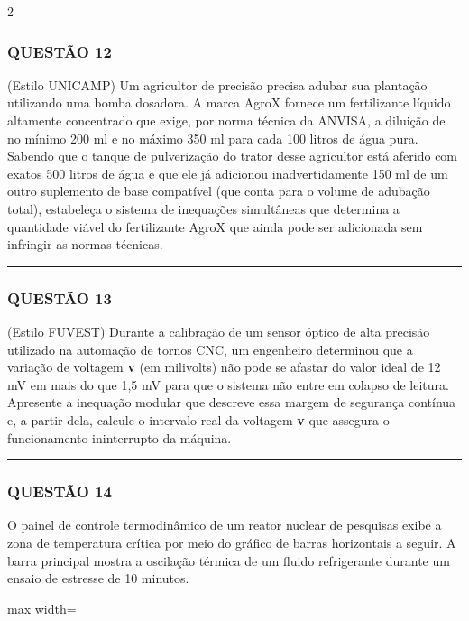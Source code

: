 \documentclass[twoside, 10pt, a4paper]{article}
\begin{document}
\begin{multicols*}{2}
\subsubsection*{QUESTÃO 12}
(Estilo UNICAMP) Um agricultor de precisão precisa adubar sua plantação utilizando uma bomba dosadora. A marca AgroX fornece um fertilizante líquido altamente concentrado que exige, por norma técnica da ANVISA, a diluição de no mínimo 200 ml e no máximo 350 ml para cada 100 litros de água pura. Sabendo que o tanque de pulverização do trator desse agricultor está aferido com exatos 500 litros de água e que ele já adicionou inadvertidamente 150 ml de um outro suplemento de base compatível (que conta para o volume de adubação total), estabeleça o sistema de inequações simultâneas que determina a quantidade viável do fertilizante AgroX que ainda pode ser adicionada sem infringir as normas técnicas.
\vspace{0cm} \noindent\textcolor{CorLinha}{\rule{\linewidth}{0.5pt}} \vspace{-0.2cm}
\subsubsection*{QUESTÃO 13}
(Estilo FUVEST) Durante a calibração de um sensor óptico de alta precisão utilizado na automação de tornos CNC, um engenheiro determinou que a variação de voltagem \textbf{v} (em milivolts) não pode se afastar do valor ideal de 12 mV em mais do que 1,5 mV para que o sistema não entre em colapso de leitura. Apresente a inequação modular que descreve essa margem de segurança contínua e, a partir dela, calcule o intervalo real da voltagem \textbf{v} que assegura o funcionamento ininterrupto da máquina.
\vspace{0cm} \noindent\textcolor{CorLinha}{\rule{\linewidth}{0.5pt}} \vspace{-0.2cm}
\subsubsection*{QUESTÃO 14}
O painel de controle termodinâmico de um reator nuclear de pesquisas exibe a zona de temperatura crítica por meio do gráfico de barras horizontais a seguir. A barra principal mostra a oscilação térmica de um fluido refrigerante durante um ensaio de estresse de 10 minutos.

\begin{center}
\begin{adjustbox}{max width=\linewidth}
\end{adjustbox}
\end{center}
\end{multicols*}
\end{document}
